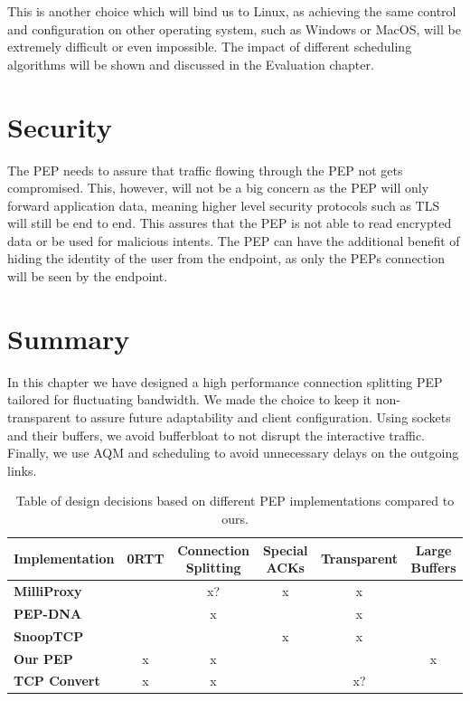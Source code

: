 \documentclass[a4paper,english, 11pt]{report}
\begin{document}
This is another choice which will bind us to Linux, as achieving the same control and configuration on other operating system, such as Windows or MacOS, will be extremely difficult or even impossible. The impact of different scheduling algorithms will be shown and discussed in the Evaluation chapter.

\section{Security}
The PEP needs to assure that traffic flowing through the PEP not gets compromised. This, however, will not be a big concern as the PEP will only forward application data, meaning higher level security protocols such as TLS will still be end to end. This assures that the PEP is not able to read encrypted data or be used for malicious intents. The PEP can have the additional benefit of hiding the identity of the user from the endpoint, as only the PEPs connection will be seen by the endpoint.

\section{Summary}
In this chapter we have designed a high performance connection splitting PEP tailored for fluctuating bandwidth. We made the choice to keep it non-transparent to assure future adaptability and client configuration. Using sockets and their buffers, we avoid bufferbloat to not disrupt the interactive traffic. Finally, we use AQM and scheduling to avoid unnecessary delays on the outgoing links.\\

\begin{table}[h!]
\centering
\begin{tabularx}{\linewidth}{lCCCCC}
\toprule
Implementation & 0RTT & Connection Splitting & Special ACKs & Transparent & Large Buffers \\
\midrule
\textbf{MilliProxy} &  & x? & x & x &  \\
\textbf{PEP-DNA} &  & x &  & x &  \\
\textbf{SnoopTCP} &  &  & x & x &  \\
\textbf{Our PEP} & x & x &  &  & x \\
\textbf{TCP Convert} & x & x &  & x? &  \\
\bottomrule
\end{tabularx}
\caption{Table of design decisions based on different PEP implementations compared to ours.}
\label{tab:summary}
\end{table}
\end{document}
